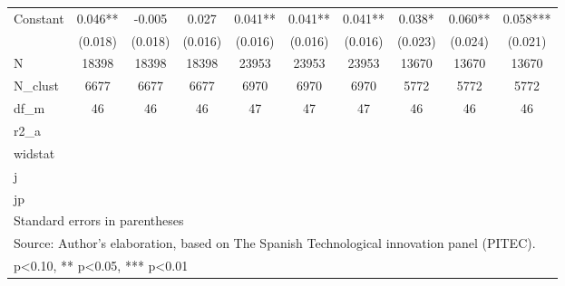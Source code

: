 \begin{table}[htbp]
\begin{tabular}{l*{9}{c}}
Constant            &       0.046** &      -0.005   &       0.027   &       0.041** &       0.041** &       0.041** &       0.038*  &       0.060** &       0.058***\\
                    &     (0.018)   &     (0.018)   &     (0.016)   &     (0.016)   &     (0.016)   &     (0.016)   &     (0.023)   &     (0.024)   &     (0.021)   \\
\hline
N                   &       18398   &       18398   &       18398   &       23953   &       23953   &       23953   &       13670   &       13670   &       13670   \\
N\_clust             &        6677   &        6677   &        6677   &        6970   &        6970   &        6970   &        5772   &        5772   &        5772   \\
df\_m                &          46   &          46   &          46   &          47   &          47   &          47   &          46   &          46   &          46   \\
r2\_a                &               &               &               &               &               &               &               &               &               \\
widstat             &               &               &               &               &               &               &               &               &               \\
j                   &               &               &               &               &               &               &               &               &               \\
jp                  &               &               &               &               &               &               &               &               &               \\
\hline\hline
\multicolumn{10}{l}{\footnotesize Standard errors in parentheses}\\
\multicolumn{10}{l}{\footnotesize Source: Author's elaboration, based on The Spanish Technological innovation panel (PITEC).}\\
\multicolumn{10}{l}{\footnotesize * p<0.10, ** p<0.05, *** p<0.01}\\
\end{tabular}
\end{table}
